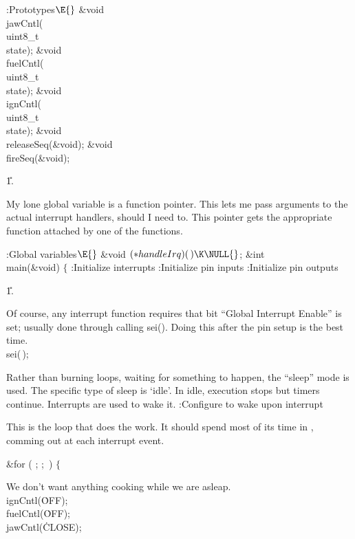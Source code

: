 \B{}:Prototypes\X${}\E{}$\6
\&{void} \\{jawCntl}(\\{uint8\_t}\\{state});\6
\&{void} \\{fuelCntl}(\\{uint8\_t}\\{state});\6
\&{void} \\{ignCntl}(\\{uint8\_t}\\{state});\6
\&{void} \\{releaseSeq}(\&{void});\6
\&{void} \\{fireSeq}(\&{void});\par
\U1.\fi

My lone global variable is a function pointer.
This lets me pass arguments to the actual interrupt handlers, should I need to.
This pointer gets the appropriate function attached by one of the 
functions.

\Y\B\4:Global variables\X${}\E{}$\6
\&{void} ${}({*}\\{handleIrq})(\,)\K\NULL{}$;\6
\&{int} \\{main}(\&{void})\1\1\6
$\{{}$\6
:Initialize interrupts\X\6
:Initialize pin inputs\X\6
:Initialize pin outputs\X\par
\U1.\fi

Of course, any interrupt function requires that bit ``Global Interrupt Enable''
is set; usually done through calling sei(). Doing this after the pin setup is
the best time.
\Y\B\\{sei}(\,);\par
\fi

Rather than burning loops, waiting for something to happen,
the ``sleep'' mode is used.
The specific type of sleep is `idle'.
In idle, execution stops but timers continue.
Interrupts are used to wake it.
\Y\B{}:Configure to wake upon interrupt\X\par
\fi

This is the loop that does the work.
It should spend most of its time in ,
comming out at each interrupt event.

\Y\B\&{for} ( ;  ; \,)\6
$\{{}$\par
\fi

We don't want anything cooking while we are asleap.
\Y\B\\{ignCntl}(\.{OFF});\6
\\{fuelCntl}(\.{OFF});\6
\\{jawCntl}(\.{CLOSE});\par
\fi

